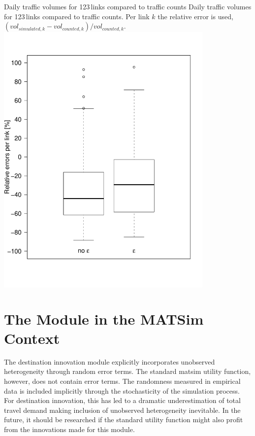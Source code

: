 \createfigure%
{Daily traffic volumes for 123\,links compared to traffic counts}%
{Daily traffic volumes for 123\,links compared to traffic counts. Per link $k$ the relative error is used, \ie $(vol_{simulated,k}-vol_{counted,k}) / vol_{counted,k}$.}%
{\label{fig:countsLEGO}}%
{\includegraphics[width=0.8\textwidth, angle=0]{extending/figures/dc/zhCounts.pdf}}%
{}

\section{The Module in the MATSim Context}
The destination innovation module explicitly incorporates unobserved heterogeneity through random error terms. 
The standard \gls{matsim} utility function, however, does not contain error terms. 
The randomness measured in empirical data is included implicitly through the stochasticity of the simulation process. 
For destination innovation, this has led to a dramatic underestimation of total travel demand making inclusion of unobserved heterogeneity inevitable. 
In the future, it should be researched if the standard utility function might also profit from the innovations made for this module.

